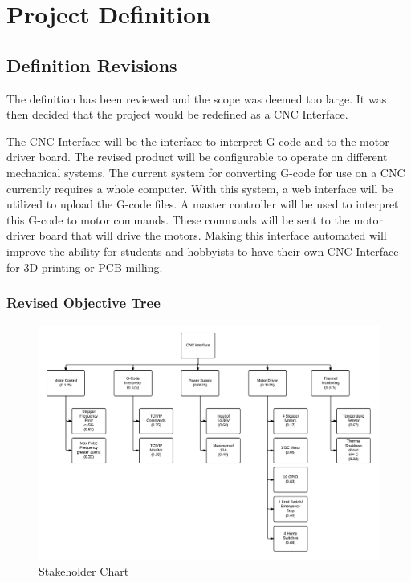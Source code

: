 \chapter{Project Definition}
\section{Definition Revisions}
The definition has been reviewed and the scope was deemed too large.
It was then decided that the project would be redefined as a CNC Interface.

The CNC Interface will be the interface to interpret G-code and to the motor driver board.
The revised product will be configurable to operate on different mechanical systems. 
The current system for converting G-code for use on a CNC currently requires a whole computer. 
With this system, a web interface will be utilized to upload the G-code files.
A master controller will be used to interpret this G-code to motor commands. 
These commands will be sent to the motor driver board that will drive the motors.
Making this interface automated will improve the ability for students and hobbyists to have their own CNC Interface for 3D printing or PCB milling.

\subsection{Revised Objective Tree}

\begin{figure}[H]
\centering
\includegraphics[width=1.0\textwidth]{otree.jpeg}
\caption{Stakeholder Chart}
\label{fig:Stakeholder Chart}
\end{figure}

